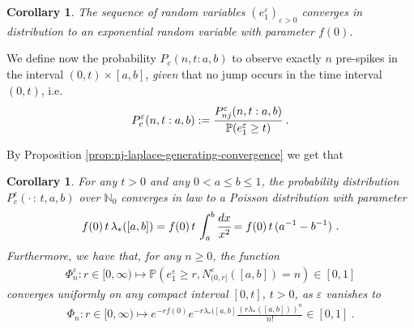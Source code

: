 \documentclass[reqno, 12pt, a4paper]{amsart}
\theoremstyle{plain}
\newtheorem{corollary}[theorem]{Corollary}
\theoremstyle{definition}
\begin{document}
\begin{corollary}
\label{cor:e_1}
The sequence of random variables $(e_1^\varepsilon)_{\varepsilon>0}$ converges in distribution to an exponential random variable with parameter $f(0)$. 
\end{corollary}

We define now the probability $P_c (n, t : a,b)$ to observe exactly $n$ pre-spikes in the interval $(0,t)\times[a,b]$, {\textit{given}} that no jump occurs in the time interval $(0,t)$, i.e.
\begin{equation}
\begin{split}
P^\varepsilon_c (n,  t : a,b):= \cfrac{P_{nj}^\varepsilon (n,t  : a,b)}{\mathbb P (e_1^\varepsilon \ge t)} \ .
\end{split}
\end{equation}

By Proposition \ref{prop:nj-laplace-generating-convergence} we get that
\begin{corollary}
\label{cor:Poisson0}
For any $t>0$ and any $0<a\le b\le1$, the probability distribution $P^\varepsilon_c( \cdot \, : \, t,a,b)$ over $\mathbb N_0$ converges in law to a Poisson distribution with parameter 
\begin{equation}
\begin{split}
f(0) \, t\,  \lambda_* ( [a,b]) = f(0)\,  t \, \int_a^b \cfrac{dx}{x^2} = f(0) \, t \,  (a^{-1}- b^{-1}) \  . 
\end{split}
\end{equation}
Furthermore, we have that, for any $n\ge 0$, the function
\begin{equation}
\begin{split}
\Phi_n^\varepsilon: r \in[0,\infty) \mapsto \mathbb P ( e_1^\varepsilon \ge r, N^\varepsilon_{(0,r]} ([a,b]) = n) \in [0,1]
\end{split}
\end{equation}
converges uniformly on any compact interval $[0,t]$, $t>0$, as $\varepsilon$ vanishes to 
\begin{equation}
\begin{split}
\Phi_n: r \in [0,\infty) \mapsto e^{-r f(0)} e^{-r \lambda_* ([a,b]} \frac{(r \lambda_* ([a,b]))^n}{n!} \in [0,1] \ .
\end{split}
\end{equation}
\end{corollary} 
\end{document}
